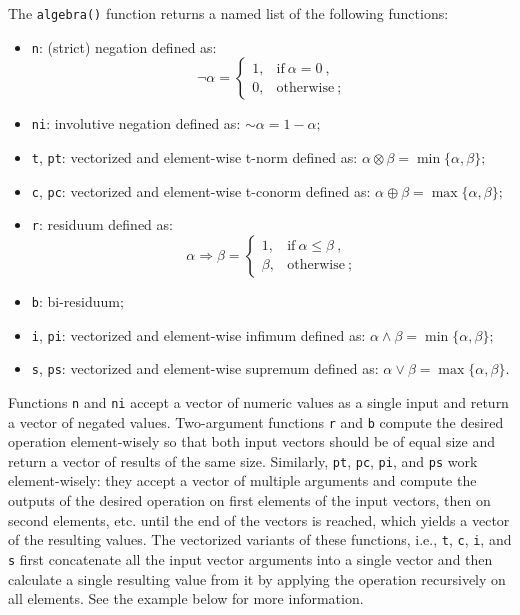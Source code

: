 \documentclass[review]{elsarticle}
\newcommand{\code}[1]{\texttt{#1}}
\begin{document}
The \code{algebra()} function returns a named list of the following functions:
\begin{itemize}
    \item \code{n}: (strict) negation defined as:
    $$
    \lnot\alpha = \begin{cases}
    1, & \text{if}\ \alpha = 0 \ , \\
    0, & \text{otherwise} \ ;
    \end{cases}
    $$
    \item \code{ni}: involutive negation defined as:
    ${\sim}\alpha = 1 - \alpha;$
    \item \code{t}, \code{pt}: vectorized and element-wise t-norm defined as:
    $\alpha \otimes \beta = \min\{\alpha, \beta\};$
    \item \code{c}, \code{pc}: vectorized and element-wise t-conorm defined as: $\alpha \oplus \beta = \max\{\alpha, \beta\};$
    \item \code{r}: residuum defined as:
    $$
    \alpha\Rightarrow\beta = \begin{cases}
    1, & \text{if}\ \alpha\le\beta \ , \\
    \beta, & \text{otherwise}\ ;
    \end{cases}
    $$
    \item \code{b}: bi-residuum;
    \item \code{i}, \code{pi}: vectorized and element-wise infimum defined as:
    $\alpha \land \beta = \min\{\alpha, \beta\};$
    \item \code{s}, \code{ps}: vectorized and element-wise supremum defined as:
    $\alpha \lor \beta = \max\{\alpha, \beta\}.$
\end{itemize}

Functions \code{n} and \code{ni} accept a vector of numeric values as a single input and return a vector of negated values. Two-argument functions \code{r} and \code{b} compute the desired operation element-wisely so that both input vectors should be of equal size and return a vector of results of the same size. Similarly, \code{pt}, \code{pc}, \code{pi}, and \code{ps} work element-wisely: they accept a vector of multiple arguments and compute the outputs of the desired operation on first elements of the input vectors, then on second elements, etc. until the end of the vectors is reached, which yields a vector of the resulting values. The vectorized variants of these functions, i.e., \code{t}, \code{c}, \code{i}, and \code{s} first concatenate all the input vector arguments into a single vector and then calculate a single resulting value from it by applying the operation recursively on all elements. See the example below for more information.
%

%
\end{document}
